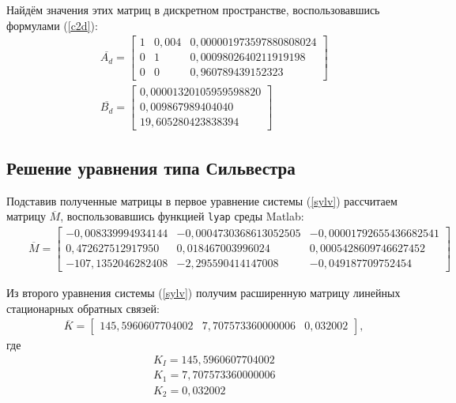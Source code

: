 \documentclass[fleqn, a4paper, 11pt, russian]{article}
\begin{document}
	Найдём значения этих матриц в дискретном пространстве, воспользовавшись формулами (\ref{c2d}):
	\begin{align}
		&&\overline{A_d} = \begin{bmatrix}
			1 & 0,004 & 0,000001973597880808024\\
			0 & 1 & 0,0009802640211919198\\
			0 & 0 & 0,960789439152323
		\end{bmatrix}\\
		&&\overline{B_d} = \begin{bmatrix}
			0,00001320105959598820\\
			0,009867989404040\\
			19,605280423838394
		\end{bmatrix}
	\end{align}
	
	\subsection{Решение уравнения типа Сильвестра}
	Подставив полученные матрицы в первое уравнение системы (\ref{sylv}) рассчитаем матрицу $\overline{M}$, воспользовавшись функцией \texttt{lyap} среды Matlab:
	\begin{align}
		&&\overline{M} = \begin{bmatrix}
		-0,008339994934144 & -0,0004730368613052505	& -0,00001792655436682541\\
		0,472627512917950 & 0,018467003996024 & 0,0005428609746627452\\
		-107,1352046282408 & -2,295590414147008 & -0,049187709752454
		\end{bmatrix}
	\end{align}
	
	Из второго уравнения системы (\ref{sylv}) получим расширенную матрицу линейных стационарных обратных связей:
	\begin{align}
		&&\overline{K} = \begin{bmatrix}
			145,5960607704002 & 7,707573360000006 & 0,032002
		\end{bmatrix},
	\end{align}
	где
	\begin{align}
		&&K_I = 145,5960607704002\\
		&&K_1 = 7,707573360000006\\
		&&K_2 = 0,032002
	\end{align}
	\clearpage
\end{document}
